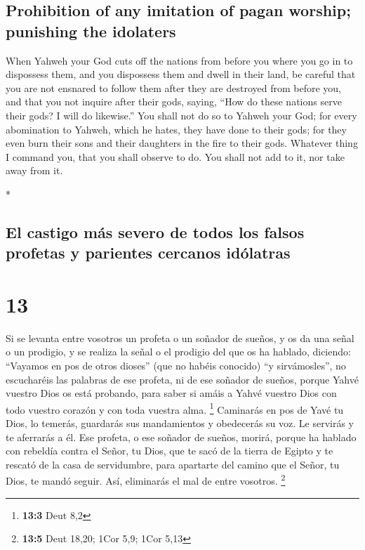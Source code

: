 \begin{paracol}{2}
\begin{otherlanguage}{english}
\hypertarget{prohibition-of-any-imitation-of-pagan-worship-punishing-the-idolaters}{%
\subsection{Prohibition of any imitation of pagan worship; punishing the
idolaters}\label{prohibition-of-any-imitation-of-pagan-worship-punishing-the-idolaters}}

 When Yahweh your God cuts off the nations from before
you where you go in to dispossess them, and you dispossess them and
dwell in their land,  be careful that you are not
ensnared to follow them after they are destroyed from before you, and
that you not inquire after their gods, saying, ``How do these nations
serve their gods? I will do likewise.''  You shall not do
so to Yahweh your God; for every abomination to Yahweh, which he hates,
they have done to their gods; for they even burn their sons and their
daughters in the fire to their gods.  Whatever thing I
command you, that you shall observe to do. You shall not add to it, nor
take away from it.

\end{otherlanguage}

\switchcolumn[0]*

\hypertarget{el-castigo-muxe1s-severo-de-todos-los-falsos-profetas-y-parientes-cercanos-iduxf3latras}{%
\subsection{El castigo más severo de todos los falsos profetas y
parientes cercanos
idólatras}\label{el-castigo-muxe1s-severo-de-todos-los-falsos-profetas-y-parientes-cercanos-iduxf3latras}}

\hypertarget{section-24}{%
\section{13}\label{section-24}}

 Si se levanta entre vosotros un profeta o un soñador de
sueños, y os da una señal o un prodigio,  y se realiza la
señal o el prodigio del que os ha hablado, diciendo: ``Vayamos en pos de
otros dioses'' (que no habéis conocido) ``y sirvámosles'',
 no escucharéis las palabras de ese profeta, ni de ese
soñador de sueños, porque Yahvé vuestro Dios os está probando, para
saber si amáis a Yahvé vuestro Dios con todo vuestro corazón y con toda
vuestra alma. \footnote{\textbf{13:3} Deut 8,2}  Caminarás
en pos de Yavé tu Dios, lo temerás, guardarás sus mandamientos y
obedecerás su voz. Le servirás y te aferrarás a él.  Ese
profeta, o ese soñador de sueños, morirá, porque ha hablado con rebeldía
contra el Señor, tu Dios, que te sacó de la tierra de Egipto y te
rescató de la casa de servidumbre, para apartarte del camino que el
Señor, tu Dios, te mandó seguir. Así, eliminarás el mal de entre
vosotros. \footnote{\textbf{13:5} Deut 18,20; 1Cor 5,9; 1Cor 5,13}


\end{paracol}
